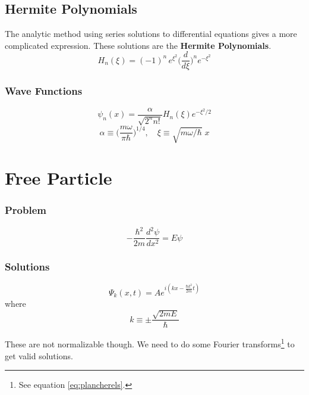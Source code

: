 \subsection{Hermite Polynomials}
The analytic method using series solutions to differential equations gives a more complicated expression. These solutions are the \textbf{Hermite Polynomials}.
\begin{equation}\label{eq:Hermite-def}
    H_n(\xi) = (-1)^n \,e^{\xi^2} \Big(\frac{d}{d\xi}\Big)^n e^{-\xi^2}
\end{equation}
\subsubsection{Wave Functions}
\begin{equation}\label{eq:HO-solutionswithhermites}
    \psi_n(x) =  \frac{\alpha}{\sqrt{2^n n!}}H_n(\xi)e^{-\xi^2/2}
\end{equation}
\begin{equation}\label{eq:HO-alpha-xi}
    \alpha \equiv \Big(\frac{m\omega}{\pi\hbar}\Big)^{1/4}, \quad \xi \equiv \sqrt{m\omega/\hbar}\;x
\end{equation}



\section{Free Particle}
\subsubsection{Problem}
\begin{equation}\label{eq:SE-infinitewell}
    -\frac{\hbar^2}{2m}\frac{d^2\psi}{dx^2} = E\psi
\end{equation}
\subsubsection{Solutions}
\begin{equation}\label{eq:freeparticlewaves}
    \Psi_k(x,t) = A e^{i(kx-\frac{\hbar k^2}{2m}t)}
\end{equation}
where
\begin{equation*}
    k\equiv \pm \frac{\sqrt{2mE}}{\hbar}
\end{equation*}

These are not normalizable though. We need to do some Fourier transforms\footnote{See equation \ref{eq:plancherels}.} to get valid solutions.

